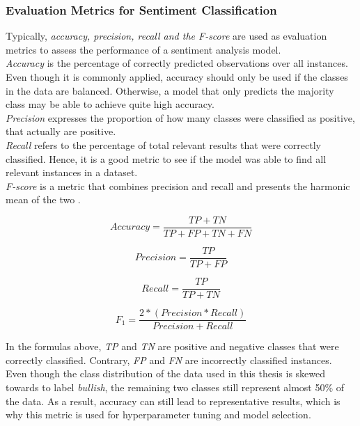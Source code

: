 \documentclass[11pt, a4paper]{article}
\begin{document}
\subsubsection{Evaluation Metrics for Sentiment Classification}
Typically, \emph{accuracy, precision, recall and the F-score} are used as evaluation metrics to assess the performance of a sentiment analysis model. \\
\emph{Accuracy} is the percentage of correctly predicted observations over all instances. Even though it is commonly applied, accuracy should only be used if the classes in the data are balanced.
Otherwise, a model that only predicts the majority class may be able to achieve quite high accuracy.\\
\emph{Precision} expresses the proportion of how many classes were classified as positive, that actually are positive.\\
\emph{Recall} refers to the percentage of total relevant results that were correctly classified. Hence, it is a good metric to see if the model was able to find all relevant instances in a dataset.\\
\emph{F-score} is a metric that combines precision and recall and presents the harmonic mean of the two \citep{hossin2015evaluationmetrics}.

\begin{equation*}
    Accuracy = \frac{TP+TN}{TP+FP+TN+FN}
\end{equation*}

\begin{equation*}
    Precision = \frac{TP}{TP+FP}
\end{equation*}

\begin{equation*}
    Recall = \frac{TP}{TP+TN}
\end{equation*}

\begin{equation*}
    F_{1}=\frac{2*(Precision * Recall)}{Precision + Recall}
\end{equation*}

\noindent In the formulas above, \emph{TP} and \emph{TN} are positive and negative classes that were correctly classified. Contrary, \emph{FP} and \emph{FN} are
incorrectly classified instances.\\
Even though the class distribution of the data used in this thesis is skewed towards to label \emph{bullish}, the remaining two classes still represent
almost 50\% of the data. As a result, accuracy can still lead to representative results, which is why this metric is used for hyperparameter tuning and model selection.
\end{document}
